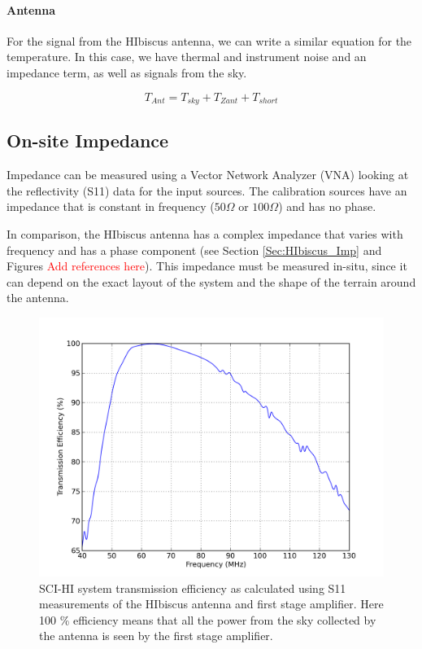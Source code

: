 \paragraph{Antenna}
For the signal from the HIbiscus antenna, we can write a similar equation for the temperature. In this case, we have thermal and instrument noise and an impedance term, as well as signals from the sky. 

\begin{equation}\label{Eq:T_ant}
T_{Ant} = T_{sky}+T_{Zant}+T_{short}
\end{equation}

\subsection{On-site Impedance}
Impedance can be measured using a Vector Network Analyzer (VNA) looking at the reflectivity (S11) data for the input sources. The calibration sources have an impedance that is constant in frequency ($50 \Omega$ or $100 \Omega$) and has no phase.

In comparison, the HIbiscus antenna has a complex impedance that varies with frequency and has a phase component (see Section \ref{Sec:HIbiscus_Imp} and Figures \textcolor{red}{Add references here}). This impedance must be measured in-situ, since it can depend on the exact layout of the system and the shape of the terrain around the antenna. 

\begin{figure}[htb]
\begin{center}
\includegraphics[width=0.9\linewidth]{Data_analysis/figures/old_ant_efficiency.png}
\caption{SCI-HI system transmission efficiency as calculated using S11 measurements of the HIbiscus antenna and first stage amplifier. Here 100 \% efficiency means that all the power from the sky collected by the antenna is seen by the first stage amplifier. }
\label{Fig:eff}
\end{center}
\end{figure}

